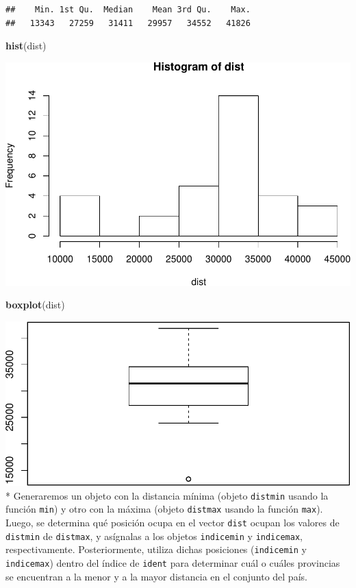 \documentclass[11pt,]{article}
\newenvironment{Shaded}{\begin{snugshade}}{\end{snugshade}}
\newcommand{\KeywordTok}[1]{\textcolor[rgb]{0.13,0.29,0.53}{\textbf{#1}}}
\newcommand{\NormalTok}[1]{#1}
\begin{document}
\begin{verbatim}
##    Min. 1st Qu.  Median    Mean 3rd Qu.    Max. 
##   13343   27259   31411   29957   34552   41826
\end{verbatim}

\begin{Shaded}
\begin{Highlighting}[]
\KeywordTok{hist}\NormalTok{(dist)}
\end{Highlighting}
\end{Shaded}

\includegraphics{proyecto_files/figure-latex/unnamed-chunk-16-1.pdf}

\begin{Shaded}
\begin{Highlighting}[]
\KeywordTok{boxplot}\NormalTok{(dist)}
\end{Highlighting}
\end{Shaded}

\includegraphics{proyecto_files/figure-latex/unnamed-chunk-16-2.pdf} *
Generaremos un objeto con la distancia mínima (objeto \texttt{distmin}
usando la función \texttt{min}) y otro con la máxima (objeto
\texttt{distmax} usando la función \texttt{max}). Luego, se determina
qué posición ocupa en el vector \texttt{dist} ocupan los valores de
\texttt{distmin} de \texttt{distmax}, y asígnalas a los objetos
\texttt{indicemin} y \texttt{indicemax}, respectivamente.
Posteriormente, utiliza dichas posiciones (\texttt{indicemin} y
\texttt{indicemax}) dentro del índice de \texttt{ident} para determinar
cuál o cuáles provincias se encuentran a la menor y a la mayor distancia
en el conjunto del país.
\end{document}
